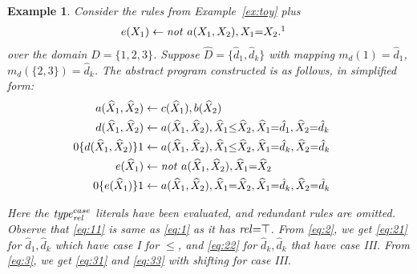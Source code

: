 \documentclass{new_tlp}
\newcommand{\comment}[1]{{\bf\color{blue}{*** #1 ***}}}
\newcommand{\comment}[1]{}
\newcommand{\nqbls}{\vspace*{-0.25\baselineskip}}
\def\mi#1{\mathit{#1\/}}
\newtheorem{exmp}{Example}
\begin{document}
\begin{exmp}\label{ex:toy_dom}
Consider the rules from Example~\ref{ex:toy} plus 
\begin{align}
  e(X_1) &\leftarrow \mi{not}\ a(X_1,X_2), X_1{=}X_2.\footnotemark  \label{eq:3}
\end{align} 
%
\noindent  over the domain $D=\{1,2,3\}$.
%
Suppose $\widehat{D}{=}\{\hat{d}_1,\hat{d}_k\}$ with mapping $m_{d}(1){=}\hat{d}_1$, $m_{d}(\{2,3\}){=}\hat{d}_k$. The abstract program constructed is as follows, in simplified form:
\vspace*{-.25\baselineskip}
\begin{align}
  a(\widehat{X}_1,\widehat{X}_2) &\leftarrow c(\widehat{X}_1), b(\widehat{X}_2) \label{eq:11}\\%
  d(\widehat{X}_1,\widehat{X}_2) &\leftarrow a(\widehat{X}_1,\widehat{X}_2), \widehat{X}_1 {\leq} \widehat{X}_2, \widehat{X}_1 {=} \hat{d}_1,\widehat{X}_2 {=} \hat{d}_k \!\!\label{eq:21}\\%
  \hspace{-0.45cm} 0\{d(\widehat{X}_1,\widehat{X}_2)\}1 & \leftarrow a(\widehat{X}_1,\widehat{X}_2), \widehat{X}_1 {\leq} \widehat{X}_2,\widehat{X}_1{=} \hat{d}_k,\widehat{X}_2 {=} \hat{d}_k \label{eq:22}\\%
  e(\widehat{X}_1) &\leftarrow \mi{not}\ a(\widehat{X}_1,\widehat{X}_2), \widehat{X}_1{=}\widehat{X}_2 \!\!\!\!\label{eq:31}\\%
0\{e(\widehat{X}_1)\}1 &\leftarrow a(\widehat{X}_1,\widehat{X}_2), \widehat{X}_1{=}\widehat{X}_2, \widehat{X}_1{=} \hat{d}_k,\widehat{X}_2 {=} \hat{d}_k \label{eq:33}
\end{align} 
\vspace*{-1\baselineskip}

\noindent Here the $\mi{type}^{case}_{\mi{rel}}$ literals have been evaluated, and
redundant rules are omitted.
Observe that \eqref{eq:11} is same as \eqref{eq:1} as it has
$\mi{rel}{=}\top$. 
From \eqref{eq:2}, we get \eqref{eq:21} for $\hat{d}_1,\hat{d}_k$ which have case I for $\leq$, and \eqref{eq:22} for $\hat{d}_k,\hat{d}_k$ that have case III. From \eqref{eq:3}, we get \eqref{eq:31} and \eqref{eq:33} with shifting for case III.


\end{exmp}
\end{document}
